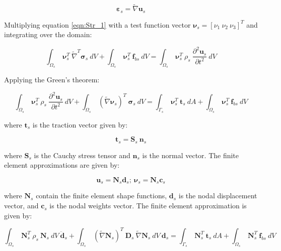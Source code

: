\documentclass[3p]{elsarticle}
\begin{document}
\begin{equation}
    \label{eqn:Str_4}
    \pmb{\varepsilon}_s = \widetilde{\nabla}\mathbf{u}_s
\end{equation}

\noindent Multiplying equation \eqref{eqn:Str_1} with a test function vector $\pmb{\nu}_s = [\nu_1~\nu_2~\nu_3]^T$ and integrating over the domain:

\begin{equation}
    \label{eqn:Str_5}
    \int_{\Omega_s}~\pmb{\nu}_s^T~\widetilde{\nabla}^T \pmb{\sigma}_s~dV + \int_{\Omega_s}~\pmb{\nu}_s^T~\mathbf{f}_{bs}~dV = \int_{\Omega_s}~\pmb{\nu}_s^T~\rho_s~\frac{\partial^2\mathbf{u}_s}{\partial t^2}~dV
\end{equation}

\noindent Applying the Green's theorem:

\begin{equation}
    \label{eqn:Str_6}
     \int_{\Omega_s}~\pmb{\nu}_s^T~\rho_s~\frac{\partial^2\mathbf{u}_s}{\partial t^2}~dV + \int_{\Omega_s}~(\widetilde{\nabla}\pmb{\nu}_s)^T~ \pmb{\sigma}_s~dV = \int_{\Gamma_s}~\pmb{\nu}_s^T~\mathbf{t}_s~dA + \int_{\Omega_s}~\pmb{\nu}_s^T~\mathbf{f}_{bs}~dV
\end{equation}

\noindent where $\mathbf{t}_s$ is the traction vector given by:

\begin{equation}
    \label{eqn:Str_7}
     \mathbf{t}_s = \mathbf{S}_s~\mathbf{n}_s
\end{equation}

\noindent where $\mathbf{S}_s$ is the Cauchy stress tensor and $\mathbf{n}_s$ is the normal vector. The finite element approximations are given by:

\begin{equation}
    \label{eqn:Str_8}
    \mathbf{u}_s = \mathbf{N}_s\mathbf{d}_s;~\pmb{\nu}_s = \mathbf{N}_s\mathbf{c}_s
\end{equation}

\noindent where $\mathbf{N}_s$ contain the finite element shape functions, $\mathbf{d}_s$ is the nodal displacement vector, and $\mathbf{c}_s$ is the nodal weights vector. The finite element approximation is given by:

\begin{equation}
    \label{eqn:Str_9}
    \int_{\Omega_s}~\mathbf{N}_s^T~\rho_s~\mathbf{N}_s~dV~\ddot{\mathbf{d}}_s + \int_{\Omega_s}~(\widetilde{\nabla}\mathbf{N}_s)^T~ \mathbf{D}_s~\widetilde{\nabla}\mathbf{N}_s~dV~\mathbf{d}_s = \int_{\Gamma_s}~\mathbf{N}_s^T~\mathbf{t}_s~dA + \int_{\Omega_s}~\mathbf{N}_s^T~\mathbf{f}_{bs}~dV
\end{equation}
\end{document}
